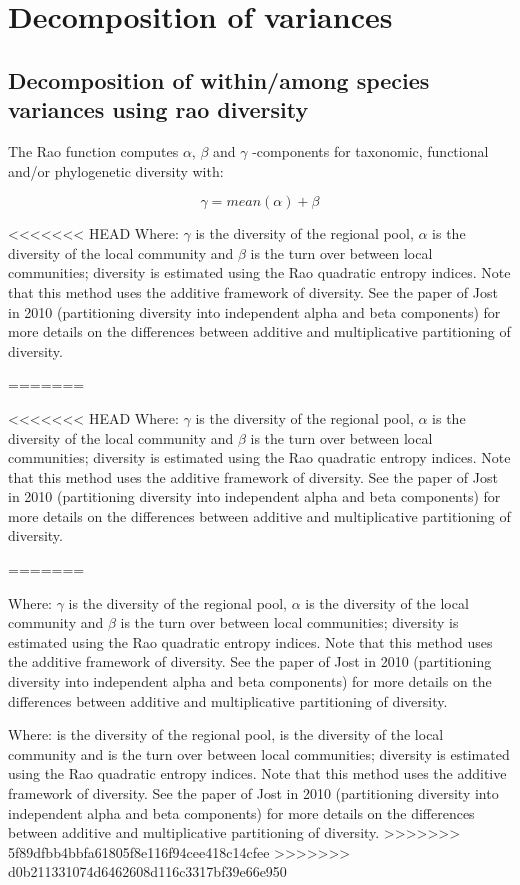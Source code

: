 \documentclass[12pt]{article}\usepackage[]{graphicx}\usepackage[]{color}
\begin{document}
\section{Decomposition of variances}

\subsection{Decomposition of within/among species variances using rao diversity}

The Rao function computes $\alpha$, $\beta$ and $\gamma$ -components for taxonomic, functional and/or phylogenetic diversity with:

$$ \gamma = mean (\alpha) + \beta $$

<<<<<<< HEAD
Where: $\gamma$ is the diversity of the regional pool, $\alpha$ is the diversity of the local community and $\beta$ is the turn over between local communities; diversity is estimated using the Rao quadratic entropy indices. Note that this method uses the additive framework of diversity. See the paper of Jost in 2010 (partitioning diversity into independent alpha and beta components) for more details on the differences between additive and multiplicative partitioning of diversity.

=======

<<<<<<< HEAD
Where: $\gamma$ is the diversity of the regional pool, $\alpha$ is the diversity of the local community and $\beta$ is the turn over between local communities; diversity is estimated using the Rao quadratic entropy indices. Note that this method uses the additive framework of diversity. See the paper of Jost in 2010 (partitioning diversity into independent alpha and beta components) for more details on the differences between additive and multiplicative partitioning of diversity.

=======

Where: $\gamma$ is the diversity of the regional pool, $\alpha$ is the diversity of the local community and $\beta$ is the turn over between local communities; diversity is estimated using the Rao quadratic entropy indices. Note that this method uses the additive framework of diversity. See the paper of Jost in 2010 (partitioning diversity into independent alpha and beta components) for more details on the differences between additive and multiplicative partitioning of diversity.


Where: \gamma is the diversity of the regional pool, \alpha is the diversity of the local community and \beta is the turn over between local communities; diversity is estimated using the Rao quadratic entropy indices. Note that this method uses the additive framework of diversity. See the paper of Jost in 2010 (partitioning diversity into independent alpha and beta components) for more details on the differences between additive and multiplicative partitioning of diversity.
>>>>>>> 5f89dfbb4bbfa61805f8e116f94cee418c14cfee
>>>>>>> d0b211331074d6462608d116c3317bf39e66e950
\\
\end{document}
